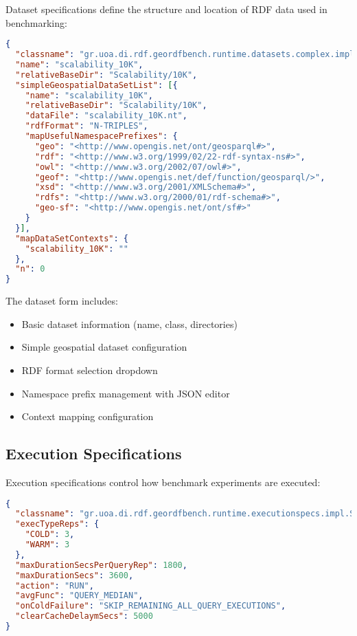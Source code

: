 \documentclass[11pt,a4paper]{article}
\begin{document}
Dataset specifications define the structure and location of RDF data used in benchmarking:

\begin{lstlisting}[language=JSON, caption=Dataset Specification Example]
{
  "classname": "gr.uoa.di.rdf.geordfbench.runtime.datasets.complex.impl.GeographicaDS",
  "name": "scalability_10K",
  "relativeBaseDir": "Scalability/10K",
  "simpleGeospatialDataSetList": [{
    "name": "scalability_10K",
    "relativeBaseDir": "Scalability/10K",
    "dataFile": "scalability_10K.nt",
    "rdfFormat": "N-TRIPLES",
    "mapUsefulNamespacePrefixes": {
      "geo": "<http://www.opengis.net/ont/geosparql#>",
      "rdf": "<http://www.w3.org/1999/02/22-rdf-syntax-ns#>",
      "owl": "<http://www.w3.org/2002/07/owl#>",
      "geof": "<http://www.opengis.net/def/function/geosparql/>",
      "xsd": "<http://www.w3.org/2001/XMLSchema#>",
      "rdfs": "<http://www.w3.org/2000/01/rdf-schema#>",
      "geo-sf": "<http://www.opengis.net/ont/sf#>"
    }
  }],
  "mapDataSetContexts": {
    "scalability_10K": ""
  },
  "n": 0
}
\end{lstlisting}

The dataset form includes:
\begin{itemize}
    \item Basic dataset information (name, class, directories)
    \item Simple geospatial dataset configuration
    \item RDF format selection dropdown
    \item Namespace prefix management with JSON editor
    \item Context mapping configuration
\end{itemize}

\subsection{Execution Specifications}

Execution specifications control how benchmark experiments are executed:

\begin{lstlisting}[language=JSON, caption=Execution Specification Example]
{
  "classname": "gr.uoa.di.rdf.geordfbench.runtime.executionspecs.impl.SimpleES",
  "execTypeReps": {
    "COLD": 3,
    "WARM": 3
  },
  "maxDurationSecsPerQueryRep": 1800,
  "maxDurationSecs": 3600,
  "action": "RUN",
  "avgFunc": "QUERY_MEDIAN",
  "onColdFailure": "SKIP_REMAINING_ALL_QUERY_EXECUTIONS",
  "clearCacheDelaymSecs": 5000
}
\end{lstlisting}
\end{document}
